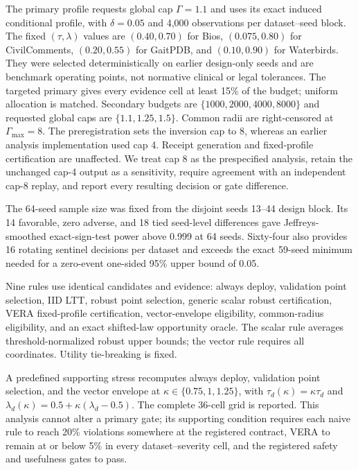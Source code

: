 The primary profile requests global cap $\Gamma=1.1$ and uses its exact induced
conditional profile, with $\delta=0.05$ and 4,000 observations per
dataset--seed block. The fixed $(\tau,\lambda)$ values are $(0.40,0.70)$ for
Bios, $(0.075,0.80)$ for CivilComments, $(0.20,0.55)$ for GaitPDB, and
$(0.10,0.90)$ for Waterbirds. They were selected deterministically on earlier
design-only seeds and are benchmark operating points, not normative clinical or
legal tolerances. The targeted primary gives every evidence cell at least 15\%
of the budget; uniform allocation is matched. Secondary budgets are
$\{1000,2000,4000,8000\}$ and requested global caps are
$\{1.1,1.25,1.5\}$. Common radii are
right-censored at $\Gamma_{\max}=8$.
The preregistration sets the inversion cap to 8, whereas an earlier analysis
implementation used cap 4. Receipt generation and fixed-profile certification
are unaffected. We treat cap 8 as the prespecified analysis, retain the
unchanged cap-4 output as a sensitivity, require agreement with an independent
cap-8 replay, and report every resulting decision or gate difference.

The 64-seed sample size was fixed from the disjoint seeds 13--44 design block.
Its 14 favorable, zero adverse, and 18 tied seed-level differences gave
Jeffreys-smoothed exact-sign-test power above 0.999 at 64 seeds. Sixty-four also
provides 16 rotating sentinel decisions per dataset and exceeds the exact
59-seed minimum needed for a zero-event one-sided 95\% upper bound of 0.05.

Nine rules use identical candidates and evidence: always deploy, validation
point selection, IID LTT, robust point selection, generic scalar robust
certification, VERA fixed-profile certification, vector-envelope eligibility,
common-radius eligibility, and an exact shifted-law opportunity oracle. The scalar rule
averages threshold-normalized robust upper bounds; the vector rule requires all
coordinates. Utility tie-breaking is fixed.

A predefined supporting stress recomputes always deploy, validation point
selection, and the vector envelope at
$\kappa\in\{0.75,1,1.25\}$, with
$\tau_d(\kappa)=\kappa\tau_d$ and
$\lambda_d(\kappa)=0.5+\kappa(\lambda_d-0.5)$. The complete 36-cell grid is
reported. This analysis cannot alter a primary gate; its supporting condition
requires each naive rule to reach 20\% violations somewhere at the registered
contract, VERA to remain at or below 5\% in every dataset--severity cell, and
the registered safety and usefulness gates to pass.

